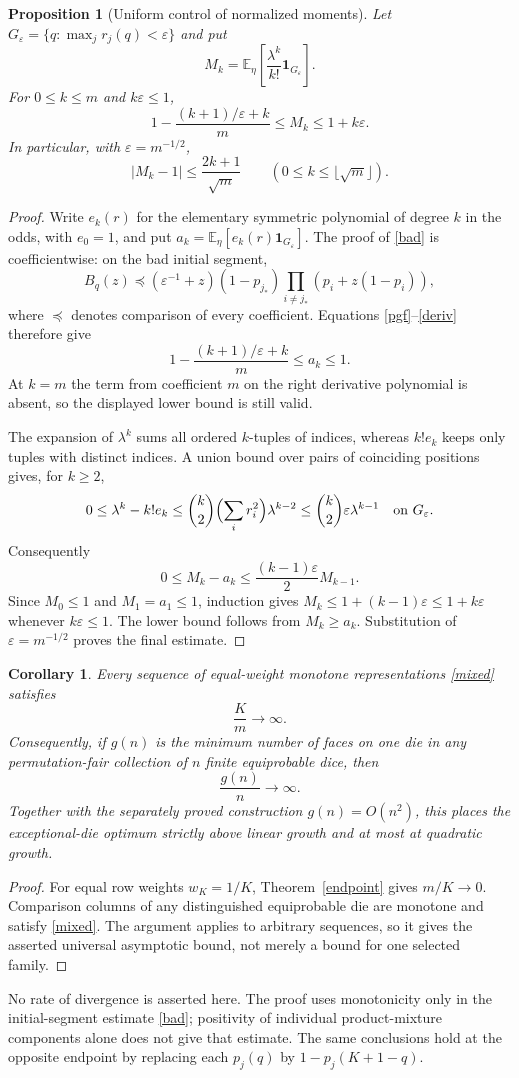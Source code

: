 \documentclass[11pt]{article}
\newtheorem{corollary}{Corollary}
\newtheorem{proposition}{Proposition}
\newcommand{\E}{\mathbb E}
\begin{document}
\begin{proposition}[Uniform control of normalized moments]\label{moments}
Let $G_\varepsilon=\{q:\max_j r_j(q)<\varepsilon\}$ and put
\[
 M_k=\E_\eta\left[\frac{\lambda^k}{k!}
                         \boldsymbol1_{G_\varepsilon}\right].
\]
For $0\le k\le m$ and $k\varepsilon\le1$,
\[
 1-\frac{(k+1)/\varepsilon+k}{m}
 \le M_k\le1+k\varepsilon.
\]
In particular, with $\varepsilon=m^{-1/2}$,
\[
 |M_k-1|\le\frac{2k+1}{\sqrt m}
 \qquad(0\le k\le\lfloor\sqrt m\rfloor).
\]
\end{proposition}
\begin{proof}
Write $e_k(r)$ for the elementary symmetric polynomial of degree $k$
in the odds, with $e_0=1$, and put
$a_k=\E_\eta[e_k(r)\boldsymbol1_{G_\varepsilon}]$.
The proof of \eqref{bad} is coefficientwise: on the bad initial
segment,
\[
 B_q(z)\preceq(\varepsilon^{-1}+z)(1-p_{j_*})
                 \prod_{i\ne j_*}(p_i+z(1-p_i)),
\]
where $\preceq$ denotes comparison of every coefficient.
Equations \eqref{pgf}--\eqref{deriv} therefore give
\[
 1-\frac{(k+1)/\varepsilon+k}{m}\le a_k\le1.
\]
At $k=m$ the term from coefficient $m$ on the right derivative
polynomial is absent, so the displayed lower bound is still valid.

The expansion of $\lambda^k$ sums all ordered $k$-tuples of indices,
whereas $k!e_k$ keeps only tuples with distinct indices. A union bound
over pairs of coinciding positions gives, for $k\ge2$,
\[
 0\le\lambda^k-k!e_k
 \le\binom k2\Bigl(\sum_i r_i^2\Bigr)\lambda^{k-2}
 \le\binom k2\varepsilon\lambda^{k-1}
 \quad\hbox{on }G_\varepsilon.
\]
Consequently
\[
 0\le M_k-a_k\le\frac{(k-1)\varepsilon}{2}M_{k-1}.
\]
Since $M_0\le1$ and $M_1=a_1\le1$, induction gives
$M_k\le1+(k-1)\varepsilon\le1+k\varepsilon$ whenever
$k\varepsilon\le1$. The lower bound follows from $M_k\ge a_k$.
Substitution of $\varepsilon=m^{-1/2}$ proves the final estimate.
\end{proof}

\begin{corollary}\label{superlinear}
Every sequence of equal-weight monotone representations
\eqref{mixed} satisfies
\[
 \frac Km\longrightarrow\infty.
\]
Consequently, if $g(n)$ is the minimum number of faces on one die in
any permutation-fair collection of $n$ finite equiprobable dice, then
\[
 \frac{g(n)}n\longrightarrow\infty.
\]
Together with the separately proved construction $g(n)=O(n^2)$, this
places the exceptional-die optimum strictly above linear growth and
at most at quadratic growth.
\end{corollary}
\begin{proof}
For equal row weights $w_K=1/K$, Theorem~\ref{endpoint} gives
$m/K\to0$. Comparison columns of any distinguished equiprobable die
are monotone and satisfy \eqref{mixed}. The argument applies to
arbitrary sequences, so it gives the asserted universal asymptotic
bound, not merely a bound for one selected family.
\end{proof}

No rate of divergence is asserted here. The proof uses monotonicity
only in the initial-segment estimate \eqref{bad}; positivity of
individual product-mixture components alone does not give that estimate.
The same conclusions hold at the opposite endpoint by replacing each
$p_j(q)$ by $1-p_j(K+1-q)$.
\end{document}
